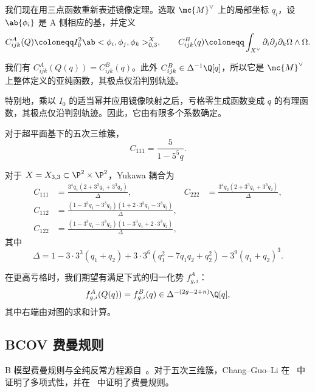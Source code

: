 我们现在用三点函数重新表述镜像定理。选取 \(\mc{M}^{\vee}\) 上的局部坐标 \(q_i\)，设 \(\ab\{\phi_i\}\) 是 A 侧相应的基，并定义
\[ C^A_{ijk}(Q) \coloneqq I_0^2 \ab<\phi_i, \phi_j, \phi_k>^X_{0,3}, \qquad C^B_{ijk}(q) \coloneqq \int_{X^{\vee}} \partial_i \partial_j \partial_k \Omega \wedge \Omega. \]

\begin{thm}
    我们有 \(C^A_{ijk}(Q(q)) = C^B_{ijk}(q)\)。此外 \(C^B_{ijk} \in \Delta^{-1}\Q[q]\)，所以它是 \(\mc{M}^{\vee}\) 上整体定义的亚纯函数，其极点仅沿判别轨迹。
\end{thm}

特别地，乘以 \(I_0\) 的适当幂并应用镜像映射之后，亏格零生成函数变成 \(q\) 的有理函数，其极点仅沿判别轨迹。因此，它由有限多个系数确定。

\begin{exm}
    对于超平面基下的五次三维簇，
    \[ C_{111} = \frac{5}{1-5^5 q}. \]
\end{exm}

\begin{exm}
    对于 \(X = X_{3,3} \subset \P^2 \times \P^2\)，Yukawa 耦合为
    \begin{align*}
        C_{111} &= \frac{3^4 q_1 (2+3^3q_1+3^3q_2)}{\Delta}, & C_{222} &= \frac{3^4 q_2(2+3^3q_1+3^3q_2)}{\Delta}, \\
        C_{112} &= \frac{(1-3^3q_1-3^3q_2)(1+2\cdot 3^3 q_1 - 3^3 q_2)}{\Delta}, \\
        C_{122} &= \frac{(1-3^3q_1-3^3q_2)(1-3^3q_1+2\cdot3^3q_2)}{\Delta},
    \end{align*}
    其中
    \[ \Delta = 1 - 3\cdot3^3(q_1+q_2) + 3\cdot3^6(q_1^2 - 7q_1q_2+q_2^2) - 3^9(q_1+q_2)^3. \]
\end{exm}

在更高亏格时，我们期望有满足下式的归一化势 \(f^A_{g,i}\)：
\[ f^A_{g,i}(Q(q)) = f^B_{g,i}(q) \in \Delta^{-(2g-2+n)}\Q[q], \]
其中右端由对图的求和计算。

\subsection{BCOV 费曼规则}%
\label{sub:The BCOV Feynman rule}

B 模型费曼规则与全纯反常方程源自~\cite{BCOV1994}。对于五次三维簇，Chang--Guo--Li 在~\cite{CGL2021} 中证明了多项式性，并在~\cite{CGL2026} 中证明了费曼规则。

